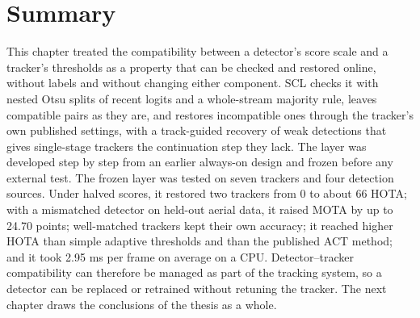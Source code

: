 \section{Summary}\label{sec:scl-summary}
This chapter treated the compatibility between a detector's score scale and a tracker's thresholds as a property that can be checked and restored online, without labels and without changing either component. SCL checks it with nested Otsu splits of recent logits and a whole-stream majority rule, leaves compatible pairs as they are, and restores incompatible ones through the tracker's own published settings, with a track-guided recovery of weak detections that gives single-stage trackers the continuation step they lack. The layer was developed step by step from an earlier always-on design and frozen before any external test. The frozen layer was tested on seven trackers and four detection sources. Under halved scores, it restored two trackers from 0 to about 66 HOTA; with a mismatched detector on held-out aerial data, it raised MOTA by up to 24.70 points; well-matched trackers kept their own accuracy; it reached higher HOTA than simple adaptive thresholds and than the published ACT method; and it took 2.95 ms per frame on average on a CPU. Detector--tracker compatibility can therefore be managed as part of the tracking system, so a detector can be replaced or retrained without retuning the tracker. The next chapter draws the conclusions of the thesis as a whole.
